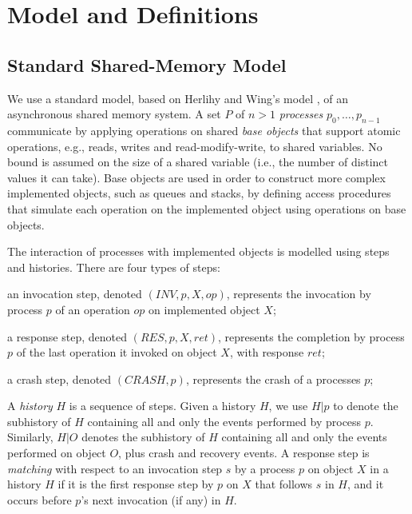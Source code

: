 
\section{Model and Definitions}
\label{section: Model}

\subsection{Standard Shared-Memory Model}

We use a standard model, based on Herlihy and Wing's model \cite{herlihyWingLinearizability}, of an asynchronous shared memory system. A set $P$ of $n > 1$ \textit{processes} $p_0, \ldots, p_{n-1}$ communicate by applying operations on shared \textit{base objects} that support atomic operations, e.g., reads, writes and read-modify-write, to shared variables. No bound is assumed on the size of a shared variable (i.e., the number of distinct values it can take).
Base objects are used in order to construct more complex implemented objects, such as queues and stacks, by defining access procedures that simulate each operation on the implemented object using operations on base objects.

The interaction of processes with implemented objects is modelled using steps and histories. There are four types of steps:
\begin{inparaenum}[(1)]
	\item an invocation step, denoted $(INV, p, X, op)$, represents the invocation by process $p$ of an operation $op$ on implemented object $X$;
	\item a response step, denoted $(RES, p, X, ret)$, represents the completion by process $p$ of the last operation it invoked on object $X$, with response $ret$;
	\item a crash step, denoted $(CRASH, p)$, represents the crash of a processes $p$;
\end{inparaenum}

A \textit{history} $H$ is a sequence of steps. Given a history $H$, we use $H | p$ to denote the subhistory of $H$ containing all and only the events performed by process $p$. Similarly, $H | O$ denotes the subhistory of $H$ containing all and only the events performed on object $O$, plus crash and recovery events.
A response step is \textit{matching} with respect to an invocation step $s$ by a process $p$ on object $X$ in a history $H$ if it is the first response step by $p$ on $X$ that follows $s$ in $H$, and it occurs before $p$'s next invocation (if any) in $H$.

